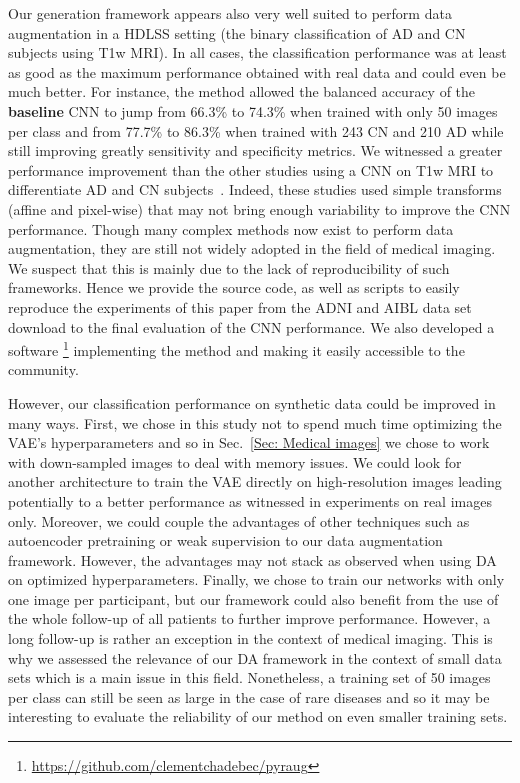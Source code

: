 \documentclass[10pt,journal,compsoc]{IEEEtran}
\begin{document}
Our generation framework appears also very well suited to perform data augmentation in a HDLSS setting (the binary classification of AD and CN subjects using T1w MRI). In all cases, the classification performance was at least as good as the maximum performance obtained with real data and could even be much better. For instance, the method allowed the balanced accuracy of the \textbf{baseline} CNN to jump from 66.3\% to 74.3\% when trained with only 50 images per class and from 77.7\% to 86.3\% when trained with 243 CN and 210 AD while still improving greatly sensitivity and specificity metrics. We witnessed a greater performance improvement than the other studies using a CNN on T1w MRI to differentiate AD and CN subjects~\cite{valliani_deep_2017, backstrom_efficient_2018, cheng_cnns_2017, aderghal_classification_2017, aderghal_classification_2018}. Indeed, these studies used simple transforms (affine and pixel-wise) that may not bring enough variability to improve the CNN performance. Though many complex methods now exist to perform data augmentation, they are still not widely adopted in the field of medical imaging. We suspect that this is mainly due to the lack of reproducibility of such frameworks. Hence we provide the source code, as well as scripts to easily reproduce the experiments of this paper from the ADNI and AIBL data set download to the final evaluation of the CNN performance. We also developed a software \footnote{\url{https://github.com/clementchadebec/pyraug}} implementing the method and making it easily accessible to the community. 

However, our classification performance on synthetic data could be improved in many ways. First, we chose in this study not to spend much time optimizing the VAE's hyperparameters and so in Sec.~\ref{Sec: Medical images} we chose to work with down-sampled images to deal with memory issues. We could look for another architecture to train the VAE directly on high-resolution images leading potentially to a better performance as witnessed in experiments on real images only. Moreover, we could couple the advantages of other techniques such as autoencoder pretraining or weak supervision to our data augmentation framework. However, the advantages may not stack as observed when using DA on optimized hyperparameters. Finally, we chose to train our networks with only one image per participant, but our framework could also benefit from the use of the whole follow-up of all patients to further improve performance. However, a long follow-up is rather an exception in the context of medical imaging. This is why we assessed the relevance of our DA framework in the context of small data sets which is a main issue in this field. Nonetheless, a training set of 50 images per class can still be seen as large in the case of rare diseases and so it may be interesting to evaluate the reliability of our method on even smaller training sets.
\end{document}
